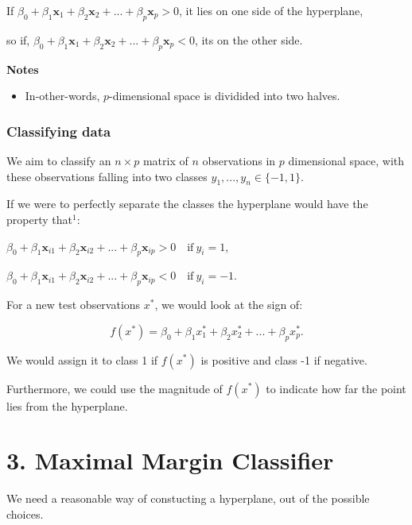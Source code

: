 \documentclass[11pt]{article}
\providecommand{\tightlist}{%
      \setlength{\itemsep}{0pt}\setlength{\parskip}{0pt}}
\begin{document}
    If
\(\beta_0 + \beta_1\mathbf{x}_1 + \beta_2\mathbf{x}_2 + ... + \beta_p\mathbf{x}_p > 0\),
it lies on one side of the hyperplane,

so if,
\(\beta_0 + \beta_1\mathbf{x}_1 + \beta_2\mathbf{x}_2 + ... + \beta_p\mathbf{x}_p < 0\),
its on the other side.

    \textbf{Notes}

\begin{itemize}
\tightlist
\item
  In-other-words, \(p\)-dimensional space is dividided into two halves.
\end{itemize}

    \hypertarget{classifying-data}{%
\subsubsection{Classifying data}\label{classifying-data}}

We aim to classify an \(n \times p\) matrix of \(n\) observations in
\(p\) dimensional space, with these observations falling into two
classes \(y_1,...,y_n \in \{-1,1\}\).

If we were to perfectly separate the classes the hyperplane would have
the property that\(^1\):

\(\beta_0 + \beta_1\mathbf{x}_{i1} + \beta_2\mathbf{x}_{i2} + ... + \beta_p\mathbf{x}_{ip} > 0 \quad \text{if} \ y_i = 1\),

\(\beta_0 + \beta_1\mathbf{x}_{i1} + \beta_2\mathbf{x}_{i2} + ... + \beta_p\mathbf{x}_{ip} < 0 \quad \text{if} \ y_i = -1\).

    For a new test observations \(x^*\), we would look at the sign of:

\[f(x^*) = \beta_0 + \beta_1x_1^* + \beta_2x_2^* + ... + \beta_px_p^*.\]

We would assign it to class 1 if \(f(x^*)\) is positive and class -1 if
negative.

Furthermore, we could use the magnitude of \(f(x^*)\) to indicate how
far the point lies from the hyperplane.

    \hypertarget{maximal-margin-classifier}{%
\section{\texorpdfstring{3. Maximal Margin Classifier
}{3. Maximal Margin Classifier }}\label{maximal-margin-classifier}}

We need a reasonable way of constucting a hyperplane, out of the
possible choices.
\end{document}
